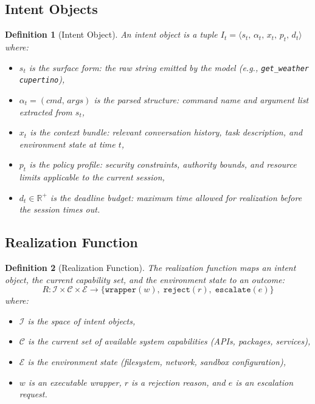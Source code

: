 \documentclass[11pt]{article}
\newtheorem{definition}{Definition}
\begin{document}
\subsection{Intent Objects}

\begin{definition}[Intent Object]
An intent object is a tuple $I_t = \langle s_t,\, \alpha_t,\, x_t,\, p_t,\, d_t \rangle$ where:
\begin{itemize}[leftmargin=*]
  \item $s_t$ is the \emph{surface form}: the raw string emitted by the model (e.g., \texttt{get\_weather cupertino}),
  \item $\alpha_t = (\textit{cmd},\, \textit{args})$ is the \emph{parsed structure}: command name and argument list extracted from $s_t$,
  \item $x_t$ is the \emph{context bundle}: relevant conversation history, task description, and environment state at time $t$,
  \item $p_t$ is the \emph{policy profile}: security constraints, authority bounds, and resource limits applicable to the current session,
  \item $d_t \in \mathbb{R}^+$ is the \emph{deadline budget}: maximum time allowed for realization before the session times out.
\end{itemize}
\end{definition}

\subsection{Realization Function}

\begin{definition}[Realization Function]
The realization function maps an intent object, the current capability set, and the environment state to an outcome:
\[
R: \mathcal{I} \times \mathcal{C} \times \mathcal{E} \rightarrow \{\texttt{wrapper}(w),\; \texttt{reject}(r),\; \texttt{escalate}(e)\}
\]
where:
\begin{itemize}[leftmargin=*]
  \item $\mathcal{I}$ is the space of intent objects,
  \item $\mathcal{C}$ is the current set of available system capabilities (APIs, packages, services),
  \item $\mathcal{E}$ is the environment state (filesystem, network, sandbox configuration),
  \item $w$ is an executable wrapper, $r$ is a rejection reason, and $e$ is an escalation request.
\end{itemize}
\end{definition}
\end{document}
